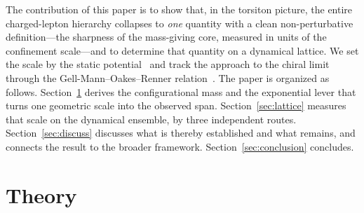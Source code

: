 \documentclass[aps,prd,reprint,nofootinbib,superscriptaddress]{revtex4-2}
\begin{document}
The contribution of this paper is to show that, in the torsiton picture, the entire charged-lepton
hierarchy collapses to \emph{one} quantity with a clean non-perturbative definition---the sharpness of
the mass-giving core, measured in units of the confinement scale---and to determine that quantity on a
dynamical lattice. We set the scale by the static potential~\citep{wilson1974, sommer1994} and track
the approach to the chiral limit through the Gell-Mann--Oakes--Renner relation~\citep{gmor1968}. The
paper is organized as follows. Section~\ref{sec:theory} derives the configurational mass and the
exponential lever that turns one geometric scale into the observed span. Section~\ref{sec:lattice}
measures that scale on the dynamical ensemble, by three independent routes. Section~\ref{sec:discuss}
discusses what is thereby established and what remains, and connects the result to the broader
framework. Section~\ref{sec:conclusion} concludes.

\section{Theory}
\label{sec:theory}
\end{document}
